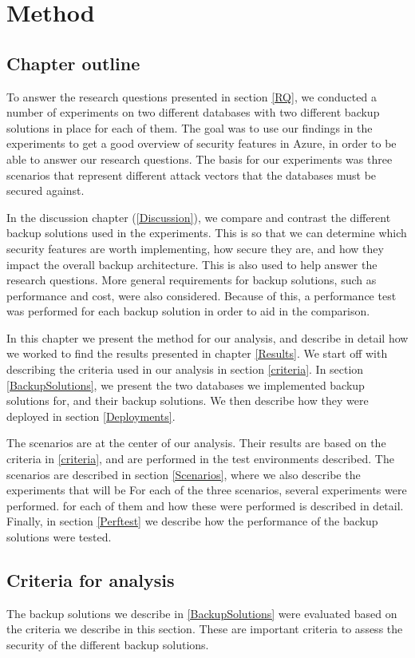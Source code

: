 \chapter{Method}

\label{Method}
\section{Chapter outline}
To answer the research questions presented in section \ref{RQ}, we conducted a number of experiments on two different databases with two different backup solutions in place for each of them. 
The goal was to use our findings in the experiments to get a good overview of security features in Azure,
in order to be able to answer our research questions.
The basis for our experiments was three scenarios that represent different attack vectors that the databases must be secured against. 

In the discussion chapter (\ref{Discussion}), we compare and contrast the different backup solutions used in the experiments. This is so that we can determine which security features are worth implementing, how secure they are, and how they impact the overall backup architecture. This is also used to help answer the research questions. More general requirements for backup solutions, such as performance and cost, were also considered.
Because of this, a performance test was performed for each backup solution in order to aid in the comparison. 

In this chapter we present the method for our analysis, and describe in detail how we worked to find the results presented in chapter \ref{Results}. We start off with describing the criteria used in our analysis in section \ref{criteria}. In section \ref{BackupSolutions}, we present the two databases we implemented backup solutions for, and their backup solutions. We then describe how they were deployed in section \ref{Deployments}. 

The scenarios are at the center of our analysis.
Their results are based on the criteria in \ref{criteria}, and are performed in the test environments described.
The scenarios are described in section \ref{Scenarios}, where we also describe the experiments that will be
For each of the three scenarios, several experiments were performed.
for each of them and how these were performed is described in detail.
Finally, in section \ref{Perftest} we describe how the performance of the backup solutions were tested.

\section{Criteria for analysis}
The backup solutions we describe in \ref{BackupSolutions} were evaluated based on the criteria we describe in this section. These are important criteria to assess the security of the different backup solutions. 
\label{criteria}

